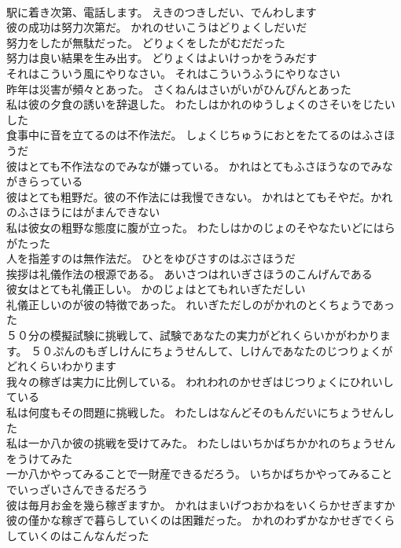 \documentclass[8pt]{extreport}
\begin{document}
\begin{CJK}{UTF8}{min}
\\	駅に着き次第、電話します。	えきのつきしだい、でんわします 
\\	彼の成功は努力次第だ。	かれのせいこうはどりょくしだいだ 
\\	努力をしたが無駄だった。	どりょくをしたがむだだった 
\\	努力は良い結果を生み出す。	どりょくはよいけっかをうみだす 
\\	それはこういう風にやりなさい。	それはこういうふうにやりなさい 
\\	昨年は災害が頻々とあった。	さくねんはさいがいがひんぴんとあった 
\\	私は彼の夕食の誘いを辞退した。	わたしはかれのゆうしょくのさそいをじたいした 
\\	食事中に音を立てるのは不作法だ。	しょくじちゅうにおとをたてるのはふさほうだ 
\\	彼はとても不作法なのでみなが嫌っている。	かれはとてもふさほうなのでみながきらっている 
\\	彼はとても粗野だ。彼の不作法には我慢できない。	かれはとてもそやだ。かれのふさほうにはがまんできない 
\\	私は彼女の粗野な態度に腹が立った。	わたしはかのじょのそやなたいどにはらがたった 
\\	人を指差すのは無作法だ。	ひとをゆびさすのはぶさほうだ 
\\	挨拶は礼儀作法の根源である。	あいさつはれいぎさほうのこんげんである 
\\	彼女はとても礼儀正しい。	かのじょはとてもれいぎただしい 
\\	礼儀正しいのが彼の特徴であった。	れいぎただしのがかれのとくちょうであった 
\\	５０分の模擬試験に挑戦して、試験であなたの実力がどれくらいかがわかります。	５０ぷんのもぎしけんにちょうせんして、しけんであなたのじつりょくがどれくらいわかります 
\\	我々の稼ぎは実力に比例している。	われわれのかせぎはじつりょくにひれいしている 
\\	私は何度もその問題に挑戦した。	わたしはなんどそのもんだいにちょうせんした 
\\	私は一か八か彼の挑戦を受けてみた。	わたしはいちかばちかかれのちょうせんをうけてみた 
\\	一か八かやってみることで一財産できるだろう。	いちかばちかやってみることでいっざいさんできるだろう 
\\	彼は毎月お金を幾ら稼ぎますか。	かれはまいげつおかねをいくらかせぎますか 
\\	彼の僅かな稼ぎで暮らしていくのは困難だった。	かれのわずかなかせぎでくらしていくのはこんなんだった 

\end{CJK}
\end{document}
